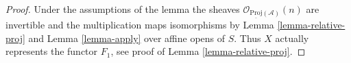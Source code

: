 \begin{proof}
Under the assumptions of the lemma the sheaves
$\mathcal{O}_{\underline{\text{Proj}}(\mathcal{A})}(n)$
are invertible and the multiplication maps isomorphisms
by Lemma \ref{lemma-relative-proj} and
Lemma \ref{lemma-apply}
over affine opens of $S$. Thus $X$ actually represents the
functor $F_1$, see proof of Lemma \ref{lemma-relative-proj}.
\end{proof}












